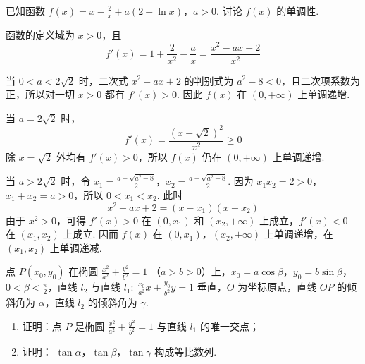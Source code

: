 \begin{problem}
已知函数 \( f(x) = x - \frac{2}{x} + a(2 - \ln x)\)，\(a > 0\). 讨论 \( f(x) \) 的单调性.
\end{problem}

\begin{solution}
函数的定义域为 \(x>0\)，且
\[
f'(x)=1+\frac{2}{x^{2}}-\frac{a}{x}=\frac{x^{2}-ax+2}{x^{2}}
\]

当 \(0<a<2\sqrt{2}\) 时，二次式 \(x^{2}-ax+2\) 的判别式为 \(a^{2}-8<0\)，且二次项系数为正，所以对一切 \(x>0\) 都有 \(f'(x)>0\). 因此 \(f(x)\) 在 \((0,+\infty)\) 上单调递增.

当 \(a=2\sqrt{2}\) 时，
\[
f'(x)=\frac{(x-\sqrt{2})^{2}}{x^{2}}\geqslant0
\]
除 \(x=\sqrt{2}\) 外均有 \(f'(x)>0\)，所以 \(f(x)\) 仍在 \((0,+\infty)\) 上单调递增.

当 \(a>2\sqrt{2}\) 时，令
\(x_{1}=\frac{a-\sqrt{a^{2}-8}}{2}\)，\(x_{2}=\frac{a+\sqrt{a^{2}-8}}{2}\).
因为 \(x_{1}x_{2}=2>0\)，\(x_{1}+x_{2}=a>0\)，所以 \(0<x_{1}<x_{2}\). 此时
\[
x^{2}-ax+2=(x-x_{1})(x-x_{2})
\]
由于 \(x^{2}>0\)，可得 \(f'(x)>0\) 在 \((0,x_{1})\) 和 \((x_{2},+\infty)\) 上成立，\(f'(x)<0\) 在 \((x_{1},x_{2})\) 上成立. 因而 \(f(x)\) 在 \((0,x_{1})\)，\((x_{2},+\infty)\) 上单调递增，在 \((x_{1},x_{2})\) 上单调递减.
\end{solution}

\begin{problem}
点 \(P(x_0, y_0)\) 在椭圆 \(\frac{x^2}{a^2} + \frac{y^2}{b^2} = 1\) （\(a > b > 0\)）上，\(x_0 = a \cos \beta\)，\(y_0 = b \sin \beta\)，\(0 < \beta < \frac{\pi}{2}\)，直线 \(l_2\) 与直线 \(l_1:\ \frac{x_0}{a^2} x + \frac{y_0}{b^2} y = 1\) 垂直，\(O\) 为坐标原点，直线 \(OP\) 的倾斜角为 \(\alpha\)，直线 \(l_2\) 的倾斜角为 \(\gamma\).

\begin{enumerate}
\item 证明：点 \(P\) 是椭圆 \(\frac{x^2}{a^2} + \frac{y^2}{b^2} = 1\) 与直线 \(l_1\) 的唯一交点；
\item 证明： \(\tan \alpha\)，\(\tan \beta\)，\(\tan \gamma\) 构成等比数列.
\end{enumerate}
\end{problem}

